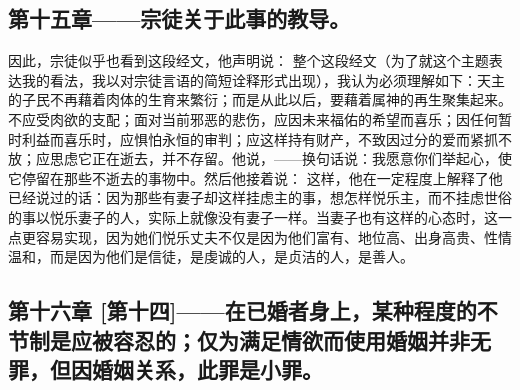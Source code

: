 \subsection{第十五章——宗徒关于此事的教导。}

因此，宗徒似乎也看到这段经文，他声明说：\newline{}\newline{} 整个这段经文（为了就这个主题表达我的看法，我以对宗徒言语的简短诠释形式出现），我认为必须理解如下：天主的子民不再藉着肉体的生育来繁衍；而是从此以后，要藉着属神的再生聚集起来。不应受肉欲的支配；面对当前邪恶的悲伤，应因未来福佑的希望而喜乐；因任何暂时利益而喜乐时，应惧怕永恒的审判；应这样持有财产，不致因过分的爱而紧抓不放；应思虑它正在逝去，并不存留。他说，——换句话说：我愿意你们举起心，使它停留在那些不逝去的事物中。然后他接着说：\newline{}\newline{} 这样，他在一定程度上解释了他已经说过的话：因为那些有妻子却这样挂虑主的事，想怎样悦乐主，而不挂虑世俗的事以悦乐妻子的人，实际上就像没有妻子一样。当妻子也有这样的心态时，这一点更容易实现，因为她们悦乐丈夫不仅是因为他们富有、地位高、出身高贵、性情温和，而是因为他们是信徒，是虔诚的人，是贞洁的人，是善人。\par


\subsection{第十六章 [第十四]——在已婚者身上，某种程度的不节制是应被容忍的；仅为满足情欲而使用婚姻并非无罪，但因婚姻关系，此罪是小罪。}

